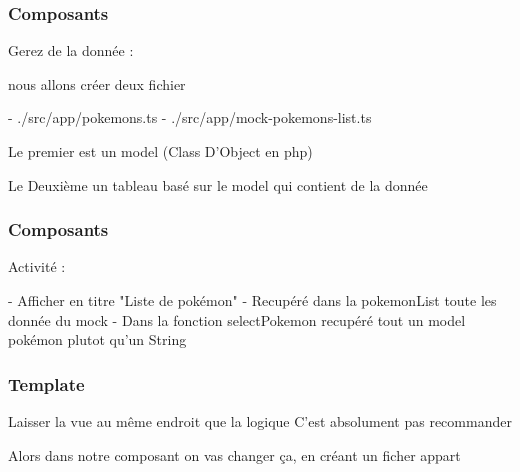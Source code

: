 \documentclass[10pt]{beamer}
\begin{document}
	\begin{frame}
		\frametitle{Composants}

		Gerez de la donnée : \newline \newline

		nous allons créer deux fichier \newline \newline

		- ./src/app/pokemons.ts \newline
		- ./src/app/mock-pokemons-list.ts \newline \newline

		Le premier est un model (Class D'Object en php) \newline \newline

		Le Deuxième un tableau basé sur le model qui contient de la donnée

	\end{frame}

	\begin{frame}
		\frametitle{Composants}

		Activité : \newline \newline

		- Afficher en titre "Liste de pokémon" \newline
		- Recupéré dans la pokemonList toute les donnée du mock \newline
		- Dans la fonction selectPokemon recupéré tout un model pokémon plutot qu'un String \newline

	\end{frame}

	\begin{frame}
		\frametitle{Template}

		Laisser la vue au même endroit que la logique \newline
		C'est absolument pas \alert{recommander} \newline \newline

		Alors dans notre composant on vas changer ça, \newline en créant un ficher appart\newline \newline

	\end{frame}
\end{document}
